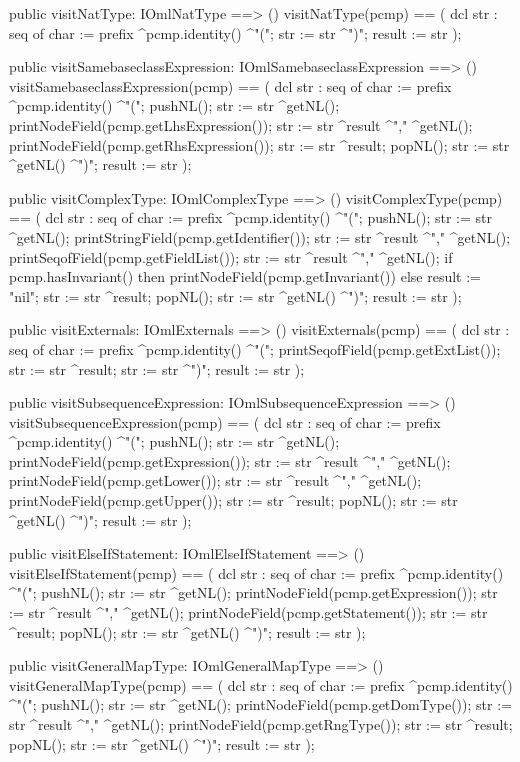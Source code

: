 \begin{vdm_al}
  public visitNatType: IOmlNatType ==> ()
  visitNatType(pcmp) ==
    ( dcl str : seq of char := prefix ^pcmp.identity() ^"(";
      str := str ^")";
      result := str );

  public visitSamebaseclassExpression: IOmlSamebaseclassExpression ==> ()
  visitSamebaseclassExpression(pcmp) ==
    ( dcl str : seq of char := prefix ^pcmp.identity() ^"(";
      pushNL();
      str := str ^getNL();
      printNodeField(pcmp.getLhsExpression());
      str := str ^result ^"," ^getNL();
      printNodeField(pcmp.getRhsExpression());
      str := str ^result;
      popNL();
      str := str ^getNL() ^")";
      result := str );

  public visitComplexType: IOmlComplexType ==> ()
  visitComplexType(pcmp) ==
    ( dcl str : seq of char := prefix ^pcmp.identity() ^"(";
      pushNL();
      str := str ^getNL();
      printStringField(pcmp.getIdentifier());
      str := str ^result ^"," ^getNL();
      printSeqofField(pcmp.getFieldList());
      str := str ^result ^"," ^getNL();
      if pcmp.hasInvariant()
      then printNodeField(pcmp.getInvariant())
      else result := "nil";
      str := str ^result;
      popNL();
      str := str ^getNL() ^")";
      result := str );

  public visitExternals: IOmlExternals ==> ()
  visitExternals(pcmp) ==
    ( dcl str : seq of char := prefix ^pcmp.identity() ^"(";
      printSeqofField(pcmp.getExtList());
      str := str ^result;
      str := str ^")";
      result := str );

  public visitSubsequenceExpression: IOmlSubsequenceExpression ==> ()
  visitSubsequenceExpression(pcmp) ==
    ( dcl str : seq of char := prefix ^pcmp.identity() ^"(";
      pushNL();
      str := str ^getNL();
      printNodeField(pcmp.getExpression());
      str := str ^result ^"," ^getNL();
      printNodeField(pcmp.getLower());
      str := str ^result ^"," ^getNL();
      printNodeField(pcmp.getUpper());
      str := str ^result;
      popNL();
      str := str ^getNL() ^")";
      result := str );

  public visitElseIfStatement: IOmlElseIfStatement ==> ()
  visitElseIfStatement(pcmp) ==
    ( dcl str : seq of char := prefix ^pcmp.identity() ^"(";
      pushNL();
      str := str ^getNL();
      printNodeField(pcmp.getExpression());
      str := str ^result ^"," ^getNL();
      printNodeField(pcmp.getStatement());
      str := str ^result;
      popNL();
      str := str ^getNL() ^")";
      result := str );

  public visitGeneralMapType: IOmlGeneralMapType ==> ()
  visitGeneralMapType(pcmp) ==
    ( dcl str : seq of char := prefix ^pcmp.identity() ^"(";
      pushNL();
      str := str ^getNL();
      printNodeField(pcmp.getDomType());
      str := str ^result ^"," ^getNL();
      printNodeField(pcmp.getRngType());
      str := str ^result;
      popNL();
      str := str ^getNL() ^")";
      result := str );


\end{vdm_al}
